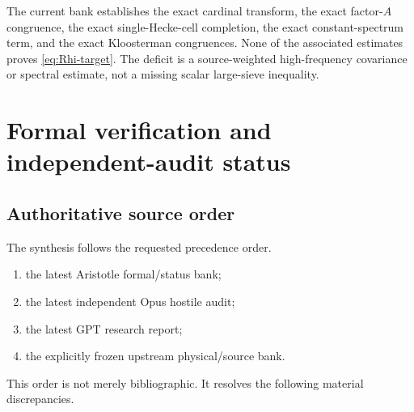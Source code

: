 \begin{status}\label{status:capacity}
The current bank establishes the exact cardinal transform, the exact
factor-$A$ congruence, the exact single-Hecke-cell completion, the exact
constant-spectrum term, and the exact Kloosterman congruences.  None of the
associated estimates proves \cref{eq:Rhi-target}.  The deficit is a
source-weighted high-frequency covariance or spectral estimate, not a missing
scalar large-sieve inequality.
\end{status}


\section{Formal verification and independent-audit status}\label{sec:formal}

\subsection{Authoritative source order}

The synthesis follows the requested precedence order.
\begin{enumerate}[label=\textup{(\arabic*)},leftmargin=2.7em]
\item the latest Aristotle formal/status bank;
\item the latest independent Opus hostile audit;
\item the latest GPT research report;
\item the explicitly frozen upstream physical/source bank.
\end{enumerate}
This order is not merely bibliographic.  It resolves the following material
discrepancies.


